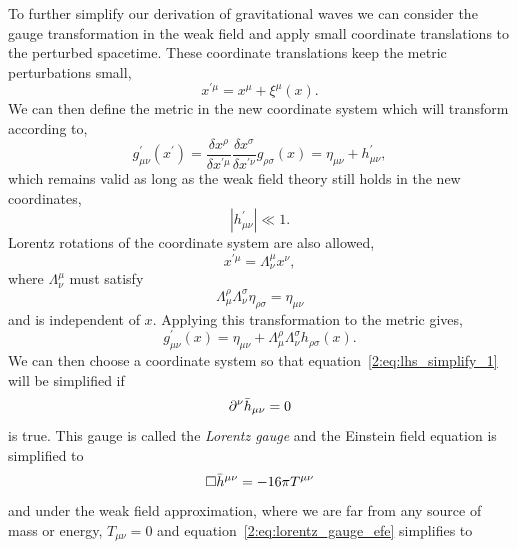To further simplify our derivation of gravitational waves we can consider the gauge transformation in the weak field and apply small coordinate translations to the perturbed spacetime. These coordinate translations keep the metric perturbations small,
%
\begin{equation}
    x^{\prime\mu} = x^{\mu} + \xi^{\mu}(x) .
\end{equation}
%
We can then define the metric in the new coordinate system which will transform according to,
%
\begin{equation}
    g^{\prime}_{\mu\nu}(x^{\prime}) = \frac{\delta x^{\rho}}{\delta x^{\prime\mu}} \frac{\delta x^{\sigma}}{\delta x^{\prime\nu}}  g_{\rho\sigma}(x) = \eta_{\mu\nu} + h^{\prime}_{\mu\nu},
    \label{2:eq:lhs_simplify_1}
\end{equation}
%
which remains valid as long as the weak field theory still holds in the new coordinates,
%
\begin{equation}
    |h^{\prime}_{\mu\nu}| \ll 1 .
\end{equation}
%
Lorentz rotations of the coordinate system are also allowed,
%
\begin{equation}
    x^{\prime\mu} = \Lambda^{\mu}_{\nu} x^{\nu},
\end{equation}
%
where $\Lambda^{\mu}_{\nu}$ must satisfy
%
\begin{equation}
    \Lambda^{\rho}_{\mu} \Lambda^{\sigma}_{\nu} \eta_{\rho\sigma} = \eta_{\mu\nu}
\end{equation}
%
and is independent of $x$. Applying this transformation to the metric gives,
%
\begin{equation}
    g^{\prime}_{\mu\nu}(x) = \eta_{\mu\nu} + \Lambda^{\rho}_{\mu} \Lambda^{\sigma}_{\nu} h_{\rho \sigma}(x) .
\end{equation}
%
We can then choose a coordinate system so that equation~\ref{2:eq:lhs_simplify_1} will be simplified if
%
\begin{equation}
    \partial^{\nu} \Bar{h}_{\mu\nu} = 0
    \label{2:eq:lorentz_gauge_condition}
\end{equation}
%
is true. This gauge is called the \textit{Lorentz gauge} and the Einstein field equation is simplified to
%
\begin{equation}
    \Box \Bar{h}^{\mu\nu} = -16 \pi T^{\mu\nu}
    \label{2:eq:lorentz_gauge_efe}
\end{equation}
and under the weak field approximation, where we are far from any source of mass or energy, $T_{\mu\nu} = 0$ and equation~\ref{2:eq:lorentz_gauge_efe} simplifies to
